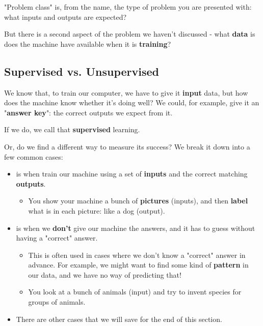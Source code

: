     "Problem class" is, from the name, the type of problem you are presented with: what inputs and outputs are expected?
    
    But there is a second aspect of the problem we haven't discussed - what \textbf{data} is does the machine have available when it is \textbf{training}?
    
    \subsection{Supervised vs. Unsupervised}
    
        We know that, to train our computer, we have to give it \textbf{input} data, but how does the machine know whether it's doing well? We could, for example, give it an "\textbf{answer key}": the correct outputs we expect from it.
        
        If we do, we call that \textbf{supervised} learning. 
        
        Or, do we find a different way to measure its success? We break it down into a few common cases:
        
        \begin{itemize}
            \item {} is when train our machine using a set of \textbf{inputs} and the correct matching \textbf{outputs}. 
                
                \begin{itemize}
                    \item \miniex You show your machine a bunch of \textbf{pictures} (inputs), and then \textbf{label} what is in each picture: like a dog (output).
                \end{itemize}
            
            \item {} is when we \textbf{don't} give our machine the answers, and it has to guess without having a "correct" answer.
                \begin{itemize}
                    \item This is often used in cases where we don't know a "correct" answer in advance. For example, we might want to find some kind of \textbf{pattern} in our data, and we have no way of predicting that!
                    
                    \item \miniex You look at a bunch of animals (input) and try to invent species for groups of animals.
                \end{itemize}
                
            \item There are other cases that we will save for the end of this section.
        \end{itemize}
        
